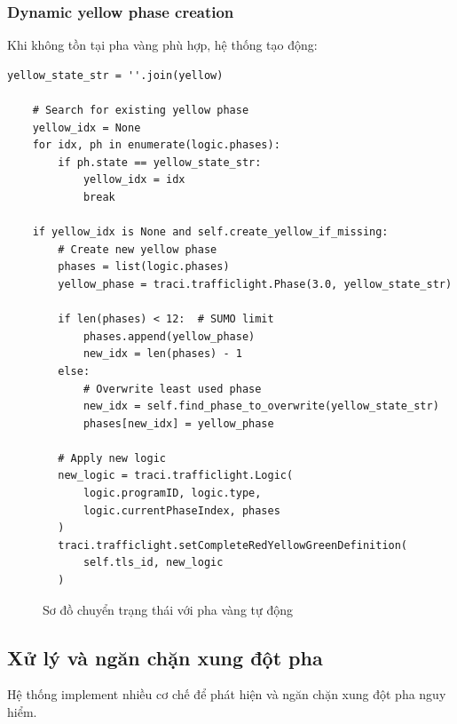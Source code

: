 \subsubsection{Dynamic yellow phase creation}

Khi không tồn tại pha vàng phù hợp, hệ thống tạo động:

\begin{lstlisting}[style=py, caption={Dynamic yellow phase creation}]
    yellow_state_str = ''.join(yellow)
    
    # Search for existing yellow phase
    yellow_idx = None
    for idx, ph in enumerate(logic.phases):
        if ph.state == yellow_state_str:
            yellow_idx = idx
            break
    
    if yellow_idx is None and self.create_yellow_if_missing:
        # Create new yellow phase
        phases = list(logic.phases)
        yellow_phase = traci.trafficlight.Phase(3.0, yellow_state_str)
        
        if len(phases) < 12:  # SUMO limit
            phases.append(yellow_phase)
            new_idx = len(phases) - 1
        else:
            # Overwrite least used phase
            new_idx = self.find_phase_to_overwrite(yellow_state_str)
            phases[new_idx] = yellow_phase
            
        # Apply new logic
        new_logic = traci.trafficlight.Logic(
            logic.programID, logic.type, 
            logic.currentPhaseIndex, phases
        )
        traci.trafficlight.setCompleteRedYellowGreenDefinition(
            self.tls_id, new_logic
        )
\end{lstlisting}

\begin{figure}[H]
    \centering
    \caption{Sơ đồ chuyển trạng thái với pha vàng tự động}
    \label{fig:yellow_phase_transition}
\end{figure}

\subsection{Xử lý và ngăn chặn xung đột pha}

Hệ thống implement nhiều cơ chế để phát hiện và ngăn chặn xung đột pha nguy hiểm.

